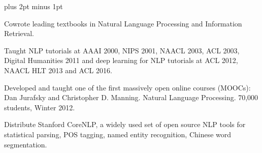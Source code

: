 \documentclass[11pt,letterpaper]{article}
\def\url#1{{\small\sf #1}}
\begin{document}
\begin{vita}
\begin{Products (other significant)}




\end{Products (other significant)}

\begin{Synergistic Activities}
\itemsep=2pt plus 2pt minus 1pt
\item Cowrote leading textbooks in Natural
  Language Processing and Information Retrieval.

\item Taught NLP tutorials at AAAI 2000, NIPS 2001, NAACL 2003,
ACL 2003, Digital Humanities 2011 and deep learning for NLP tutorials at ACL 2012, NAACL
HLT 2013 and ACL 2016.

\item Developed and taught one of the first massively open online
  courses (MOOCs): Dan Jurafsky and Christopher D. Manning. Natural Language Processing. 70,000 students, Winter 2012.

\item Distribute Stanford CoreNLP, a widely used set of open source NLP tools for statistical parsing,
POS tagging, named entity recognition, Chinese word segmentation.


\end{Synergistic Activities}
\end{vita}
\end{document}
